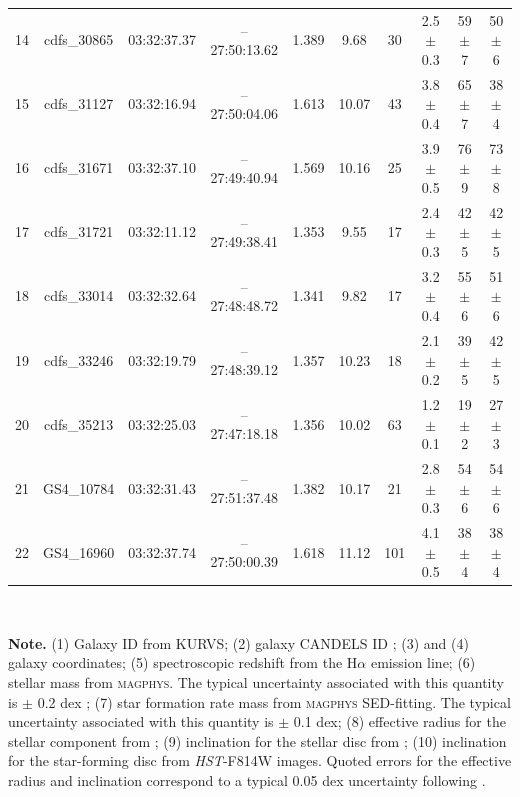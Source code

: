 \begin{table}
\begin{tabular}{cccccccccc}
14 & cdfs\_30865 & 03:32:37.37 & --27:50:13.62 & 1.389 & 9.68 & 30 & 2.5 $\pm$ 0.3 & 59 $\pm$ 7 & 50 $\pm$ 6 \\
15 & cdfs\_31127 & 03:32:16.94 & --27:50:04.06 & 1.613 & 10.07 & 43 & 3.8 $\pm$ 0.4 & 65 $\pm$ 7 & 38 $\pm$ 4 \\
16 & cdfs\_31671 & 03:32:37.10 & --27:49:40.94 & 1.569 & 10.16 & 25 & 3.9 $\pm$ 0.5 & 76 $\pm$ 9 & 73 $\pm$ 8 \\
17 & cdfs\_31721 & 03:32:11.12 & --27:49:38.41 & 1.353 & 9.55 & 17 & 2.4 $\pm$ 0.3 & 42 $\pm$ 5 & 42 $\pm$ 5 \\
18 & cdfs\_33014 & 03:32:32.64 & --27:48:48.72 & 1.341 & 9.82 & 17 & 3.2 $\pm$ 0.4 & 55 $\pm$ 6 & 51 $\pm$ 6 \\
19 & cdfs\_33246 & 03:32:19.79 & --27:48:39.12 & 1.357 & 10.23 & 18 & 2.1 $\pm$ 0.2 & 39 $\pm$ 5 & 42 $\pm$ 5 \\
20 & cdfs\_35213 & 03:32:25.03 & --27:47:18.18 & 1.356 & 10.02 & 63 & 1.2 $\pm$ 0.1 & 19 $\pm$ 2 & 27 $\pm$ 3 \\
21 & GS4\_10784 & 03:32:31.43 & --27:51:37.48 & 1.382 & 10.17 & 21 & 2.8 $\pm$ 0.3 & 54 $\pm$ 6 & 54 $\pm$ 6 \\
22 & GS4\_16960 & 03:32:37.74 & --27:50:00.39 & 1.618 & 11.12 & 101 & 4.1 $\pm$ 0.5 & 38 $\pm$ 4 & 38 $\pm$ 4 \\
\hline
\hline
\end{tabular}
\\[2mm] %
\begin{flushleft}
{\bf Note.} (1) Galaxy ID from KURVS; (2) galaxy CANDELS ID \citep{Grogin11}; 
(3) and (4) galaxy coordinates; 
(5) spectroscopic redshift from the H$\alpha$ emission line;
(6) stellar mass from \textsc{magphys}. The typical uncertainty associated with this quantity is $\pm$ 0.2 dex \citep{Mobasher15};
(7) star formation rate mass from \textsc{magphys} SED-fitting. The typical uncertainty associated with this quantity is $\pm$ 0.1 dex;
(8) effective radius for the stellar component from \citet{vanderWel14}; 
(9) inclination for the stellar disc from \citet{vanderWel14};
(10) inclination for the star-forming disc from {\it HST}-F814W images.
Quoted errors for the effective radius and inclination correspond to a typical 0.05 dex uncertainty following \cite{vanDerWel12}. 
\end{flushleft}
\end{table}
